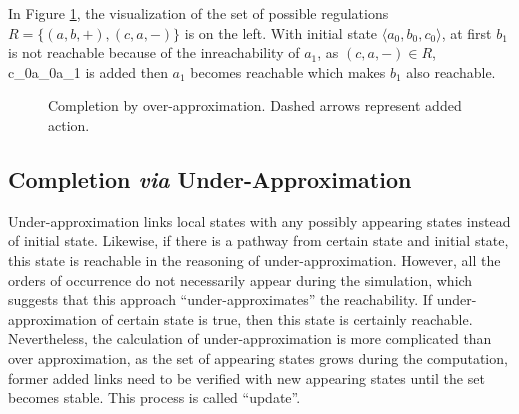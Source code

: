 In Figure \ref{CompOv}, the visualization of the set of possible regulations $R=\{(a,b,+),(c,a,-)\}$ is on the left. With initial state $\langle a_0,b_0,c_0\rangle$, at first $b_1$ is not reachable because of the inreachability of $a_1$, as $(c,a,-)\in R$, \ac{c_0}{a_0}{a_1} is added then $a_1$ becomes reachable which makes $b_1$ also reachable.

\begin{figure}[ht]
\centering
{}\qquad
{}
\caption[Completion by over-approximation]{Completion by over-approximation. Dashed arrows represent added action.}\label{CompOv}
\end{figure}


\subsection{Completion \textit{via} Under-Approximation}
Under-approximation links local states with any possibly appearing states instead of initial state. Likewise, if there is a pathway from certain state and initial state, this state is reachable in the reasoning of under-approximation. However, all the orders of occurrence do not necessarily appear during the simulation, which suggests that this approach ``under-approximates'' the reachability. If under-approximation of certain state is true, then this state is certainly reachable. Nevertheless, the calculation of under-approximation is more complicated than over approximation, as the set of appearing states grows during the computation, former added links need to be verified with new appearing states until the set becomes stable. This process is called ``update''. 

